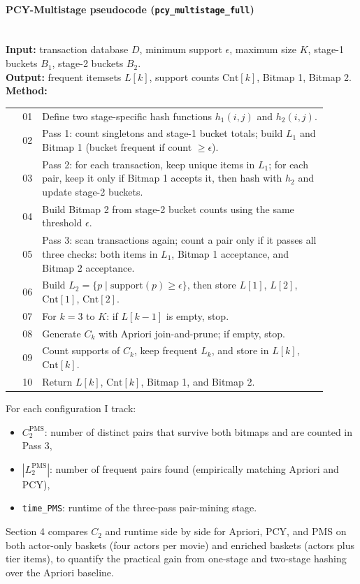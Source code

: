 \documentclass{article}  %
\begin{document}
\begin{small}
\paragraph{PCY-Multistage pseudocode (\texttt{pcy\_multistage\_full})}\mbox{}\\
\noindent\textbf{Input:} transaction database \(D\), minimum support \(\epsilon\), maximum size \(K\), stage-1 buckets \(B_1\), stage-2 buckets \(B_2\).\\
\textbf{Output:} frequent itemsets \(L[k]\), support counts \(\mathrm{Cnt}[k]\), Bitmap 1, Bitmap 2.\\
\textbf{Method:}
\begin{tabular}{@{}r p{0.90\linewidth}@{}}
01 & Define two stage-specific hash functions \(h_1(i,j)\) and \(h_2(i,j)\). \\
02 & Pass 1: count singletons and stage-1 bucket totals; build \(L_1\) and Bitmap 1 (bucket frequent if count \(\ge \epsilon\)). \\
03 & Pass 2: for each transaction, keep unique items in \(L_1\); for each pair, keep it only if Bitmap 1 accepts it, then hash with \(h_2\) and update stage-2 buckets. \\
04 & Build Bitmap 2 from stage-2 bucket counts using the same threshold \(\epsilon\). \\
05 & Pass 3: scan transactions again; count a pair only if it passes all three checks: both items in \(L_1\), Bitmap 1 acceptance, and Bitmap 2 acceptance. \\
06 & Build \(L_2=\{p\mid \mathrm{support}(p)\ge \epsilon\}\), then store \(L[1]\), \(L[2]\), \(\mathrm{Cnt}[1]\), \(\mathrm{Cnt}[2]\). \\
07 & For \(k=3\) to \(K\): if \(L[k-1]\) is empty, stop. \\
08 & Generate \(C_k\) with Apriori join-and-prune; if empty, stop. \\
09 & Count supports of \(C_k\), keep frequent \(L_k\), and store in \(L[k]\), \(\mathrm{Cnt}[k]\). \\
10 & Return \(L[k]\), \(\mathrm{Cnt}[k]\), Bitmap 1, and Bitmap 2. \\
\end{tabular}
\end{small}

For each configuration I track:
\begin{itemize}
    \item \(C_2^{\text{PMS}}\): number of distinct pairs that survive both bitmaps and are counted in Pass 3,
    \item \(|L_2^{\text{PMS}}|\): number of frequent pairs found (empirically matching Apriori and PCY),
    \item \verb|time_PMS|: runtime of the three-pass pair-mining stage.

\end{itemize}
Section 4 compares \(C_2\) and runtime side by side for Apriori, PCY, and PMS on both actor-only baskets (four actors per movie) and enriched baskets (actors plus tier items), to quantify the practical gain from one-stage and two-stage hashing over the Apriori baseline.
 
\end{document}
